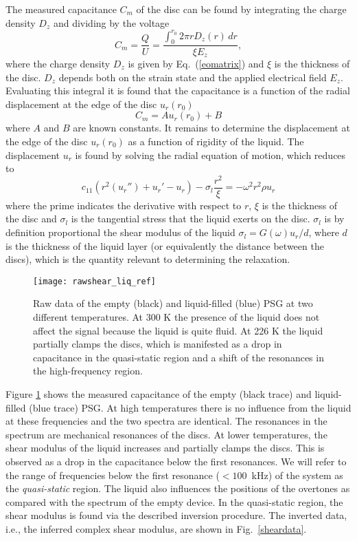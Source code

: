 \documentclass[reprint,showpacs,amsmath,amssymb,aip,jcp]{revtex4-1}
\begin{document}
The measured capacitance $C_m$ of the disc can be found by integrating
the charge density $D_z$ and dividing by the voltage
\begin{equation}
  C_m = \frac{Q}{U} = \frac{\int_0^{r_0}  2\pi r D_z(r)\,dr}{\xi
  E_z},
\end{equation}
where the charge density $D_z$ is given by Eq.\ (\ref{eomatrix}) and
$\xi$ is the thickness of the disc. $D_z$ depends both on the strain
state and the applied electrical field $E_z$. Evaluating this integral
it is found that the capacitance is a function of the radial
displacement at the edge of the disc $u_r(r_0)$
\begin{equation}
  C_m = Au_r(r_0)+B
\end{equation}
where $A$ and $B$ are known constants. It remains to determine the
displacement at the edge of the disc $u_r(r_0)$ as a function of
rigidity of the liquid. The displacement $u_r$ is found by solving the
radial equation of motion, which reduces to
\begin{equation}
  c_{11}\left(r^2(u_r'') +  u_r'-u_r  \right)  - \sigma_l
  \frac{r^2}{\xi} = -\omega^2r^2\rho u_r
\end{equation}
where the prime indicates the derivative with respect to $r$, $\xi$ is
the thickness of the disc and $\sigma_l$ is the tangential stress that
the liquid exerts on the disc. $\sigma_l$ is by definition
proportional the shear modulus of the liquid $\sigma_l= G(\omega)
u_r/d$, where $d$ is the thickness of the liquid layer (or
equivalently the distance between the discs), which is the quantity
relevant to determining the relaxation.

\begin{figure}
  \texttt{[image: rawshear\_liq\_ref]}
  \caption{\label{rawshear}Raw data of the empty (black) and
    liquid-filled (blue) PSG at two different temperatures. At 300 K
    the presence of the liquid does not affect the signal because the
    liquid is quite fluid. At 226 K the liquid partially clamps the
    discs, which is manifested as a drop in capacitance in the
    quasi-static region and a shift of the resonances in the
    high-frequency region.}
\end{figure}

Figure \ref{rawshear} shows the measured capacitance of the empty
(black trace) and liquid-filled (blue trace) PSG. At high temperatures
there is no influence from the liquid at these frequencies and the two
spectra are identical. The resonances in the spectrum are mechanical
resonances of the discs. At lower temperatures, the shear modulus of
the liquid increases and partially clamps the discs. This is observed
as a drop in the capacitance below the first resonances. We will refer
to the range of frequencies below the first resonance ($<100$~kHz) of
the system as the \emph{quasi-static} region. The liquid also
influences the positions of the overtones as compared with the spectrum
of the empty device. In the quasi-static region, the shear modulus is
found via the described inversion procedure. The inverted data, i.e.,
the inferred complex shear modulus, are shown in
Fig.\ \ref{sheardata}.
\end{document}
